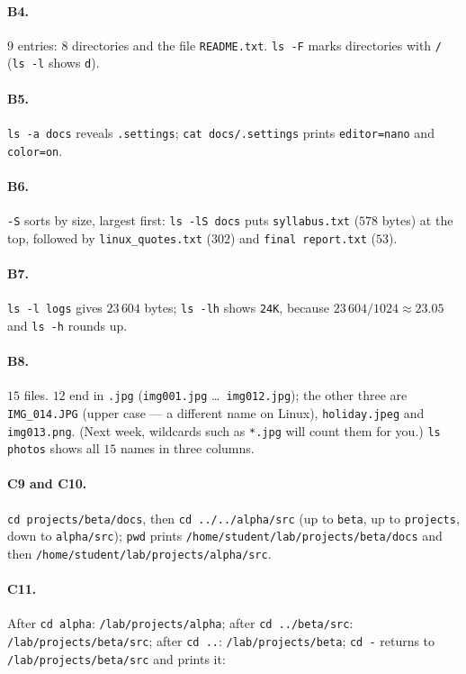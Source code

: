 \documentclass[11pt,a4paper]{article}
\newcommand{\cmd}[1]{\texttt{#1}}
\begin{document}
\paragraph{B4.} $9$ entries: $8$ directories and the file \texttt{README.txt}. \cmd{ls -F} marks directories with \texttt{/} (\cmd{ls -l} shows \texttt{d}).

\paragraph{B5.} \cmd{ls -a docs} reveals \texttt{.settings}; \cmd{cat docs/.settings} prints \texttt{editor=nano} and \texttt{color=on}.

\paragraph{B6.} \cmd{-S} sorts by size, largest first: \cmd{ls -lS docs} puts \texttt{syllabus.txt} ($578$ bytes) at the top, followed by \texttt{linux\_quotes.txt} ($302$) and \texttt{final report.txt} ($53$).

\paragraph{B7.} \cmd{ls -l logs} gives $23\,604$ bytes; \cmd{ls -lh} shows \texttt{24K}, because $23\,604/1024 \approx 23.05$ and \cmd{ls -h} rounds up.

\paragraph{B8.} $15$ files. $12$ end in \texttt{.jpg} (\texttt{img001.jpg} \ldots\ \texttt{img012.jpg}); the other three are \texttt{IMG\_014.JPG} (upper case --- a different name on Linux), \texttt{holiday.jpeg} and \texttt{img013.png}. (Next week, wildcards such as \texttt{*.jpg} will count them for you.) \cmd{ls photos} shows all $15$ names in three columns.

\paragraph{C9 and C10.} \cmd{cd projects/beta/docs}, then \cmd{cd ../../alpha/src} (up to \texttt{beta}, up to \texttt{projects}, down to \texttt{alpha/src}); \cmd{pwd} prints \texttt{/home/student/lab/projects/beta/docs} and then \texttt{/home/student/lab/projects/alpha/src}.

\paragraph{C11.} After \cmd{cd alpha}: \texttt{\tl/lab/projects/alpha}; after \cmd{cd ../beta/src}: \texttt{\tl/lab/projects/beta/src}; after \cmd{cd ..}: \texttt{\tl/lab/projects/beta}; \cmd{cd -} returns to \texttt{\tl/lab/projects/beta/src} and prints it:
\end{document}
